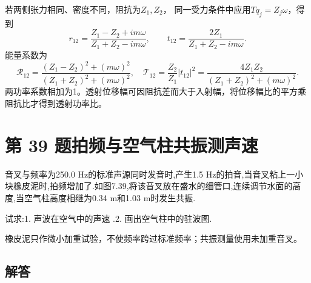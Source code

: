 \documentclass[UTF8,fontset=fandol,a4paper,11pt]{ctexart}
\newcommand{\tagline}[1]{\noindent{\small\color{muted}#1}\par}
\newcommand{\figcaption}[1]{\par\vspace{2pt}{\small\color{muted}#1}\par}
\begin{document}
若两侧张力相同、密度不同，阻抗为$Z_1,Z_2$，
同一受力条件中应用$Tq_j=Z_j\omega$，得到
\[
r_{12}=\frac{Z_1-Z_2+im\omega}{Z_1+Z_2-im\omega},\qquad
t_{12}=\frac{2Z_1}{Z_1+Z_2-im\omega}.
\]
能量系数为
\[
\mathcal R_{12}=\frac{(Z_1-Z_2)^2+(m\omega)^2}{(Z_1+Z_2)^2+(m\omega)^2},\quad
\mathcal T_{12}=\frac{Z_2}{Z_1}|t_{12}|^2
=\frac{4Z_1Z_2}{(Z_1+Z_2)^2+(m\omega)^2}.
\]
两功率系数相加为1。透射位移幅可因阻抗差而大于入射幅，将位移幅比的平方乘阻抗比才得到透射功率比。




\section*{第 39 题\quad 拍频与空气柱共振测声速}

\tagline{M-07-39}

音叉与频率为250.0 Hz的标准声源同时发音时,产生1.5
Hz的拍音,当音叉粘上一小块橡皮泥时,拍频增加了.如图7.39,将该音叉放在盛水的细管口,连续调节水面的高度,当空气柱高度相继为0.34
m和1.03 m时发生共振.

试求:1. 声波在空气中的声速 .2. 画出空气柱中的驻波图.

橡皮泥只作微小加重试验，不使频率跨过标准频率；共振测量使用未加重音叉。

\begin{center}\begin{minipage}{\linewidth}\centering{}\figcaption{图 7.39}\end{minipage}\end{center}

\subsection*{解答}
\end{document}
